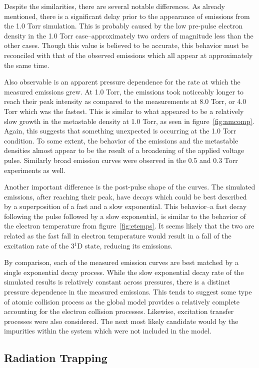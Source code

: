Despite the similarities, there are several notable differences. As already
mentioned, there is a significant delay prior to the appearance of emissions
from the 1.0 Torr simulation. This is probably caused by the low pre-pulse
electron density in the 1.0 Torr case--approximately two orders of magnitude
less than the other cases. Though this value is believed to be accurate, this
behavior must be reconciled with that of the observed emissions which all appear
at approximately the same time.

Also observable is an apparent pressure dependence for the rate at which the
measured emissions grew. At 1.0 Torr, the emissions took noticeably longer to
reach their peak intensity as compared to the measurements at 8.0 Torr, or 4.0
Torr which was the fastest. This is similar to what appeared to be a relatively
slow growth in the metastable density at 1.0 Torr, as seen in
figure~\ref{fig:nmcomp}. Again, this suggests that something unexpected is
occurring at the 1.0 Torr condition. To some extent, the behavior of the
emissions and the metastable densities almost appear to be the result of a
broadening of the applied voltage pulse. Similarly broad emission curves were
observed in the 0.5 and 0.3 Torr experiments as well.

Another important difference is the post-pulse shape of the curves. The
simulated emissions, after reaching their peak, have decays which could be best
described by a superposition of a fast and a slow exponential. This behavior--a
fast decay following the pulse followed by a slow exponential, is similar to the
behavior of the electron temperature from figure~\ref{fig:etemps}. It seems
likely that the two are related as the fast fall in electron temperature would
result in a fall of the excitation rate of the 3$^1$D state, reducing its
emissions.

By comparison, each of the measured emission curves are best matched by a single
exponential decay process. While the slow exponential decay rate of the
simulated results is relatively constant across pressures, there is a distinct
pressure dependence in the measured emissions. This tends to suggest some type
of atomic collision process as the global model provides a relatively complete
accounting for the electron collision processes. Likewise, excitation transfer
processes were also considered. The next most likely candidate would by the
impurities within the system which were not included in the model. 

\subsection{Radiation Trapping}

